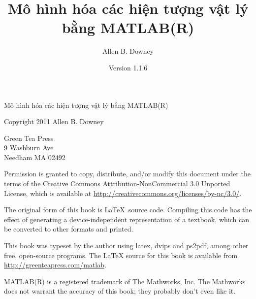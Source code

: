 \documentclass[12pt]{book}
\begin{document}
\frontmatter


\newcommand{\thetitle}{Mô hình hóa các hiện tượng vật lý bằng MATLAB(R)}
\newcommand{\theversion}{1.1.6}

\title {\thetitle}
\author {Allen B. Downey}
\date {Version \theversion}





\vspace{2in}

\begin{center}
{\Large \thetitle}

\vspace{0.25in}

Copyright 2011 Allen B. Downey
\end{center}

\vspace{0.25in}

\begin{flushleft}
Green Tea Press       \\
9 Washburn Ave \\
Needham MA 02492
\end{flushleft}

Permission is granted to copy, distribute, and/or modify this document
under the terms of the Creative Commons Attribution-NonCommercial 3.0 Unported
License, which is available at \url{http://creativecommons.org/licenses/by-nc/3.0/}.

The original form of this book is \LaTeX\ source code.  Compiling this
code has the effect of generating a device-independent representation
of a textbook, which can be converted to other formats and printed.

This book was typeset by the author using latex, dvips and ps2pdf,
among other free, open-source programs.
The LaTeX source for this book is available from
\url{http://greenteapress.com/matlab}.

MATLAB(R) is a registered trademark of The
Mathworks, Inc.  The Mathworks does not warrant the accuracy
of this book; they probably don't even like it.
\end{document}
